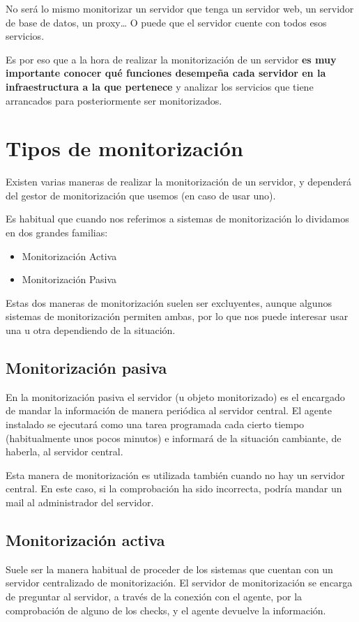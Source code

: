 No será lo mismo monitorizar un servidor que tenga un servidor web, un servidor de base de datos, un proxy… O puede que el servidor cuente con todos esos servicios.

Es por eso que a la hora de realizar la monitorización de un servidor \textbf{es muy importante conocer qué funciones desempeña cada servidor en la infraestructura a la que pertenece} y analizar los servicios que tiene arrancados para posteriormente ser monitorizados.

\fi

\section{Tipos de monitorización}
Existen varias maneras de realizar la monitorización de un servidor, y dependerá del gestor de monitorización que usemos (en caso de usar uno).

Es habitual que cuando nos referimos a sistemas de monitorización lo dividamos en dos grandes familias:
\begin{itemize}
    \item Monitorización Activa
    \item Monitorización Pasiva
\end{itemize}

Estas dos maneras de monitorización suelen ser excluyentes, aunque algunos sistemas de monitorización permiten ambas, por lo que nos puede interesar usar una u otra dependiendo de la situación.


\subsection{Monitorización pasiva}
En la monitorización pasiva el servidor (u objeto monitorizado) es el encargado de mandar la información de manera periódica al servidor central. El agente instalado se ejecutará como una tarea programada cada cierto tiempo (habitualmente unos pocos minutos) e informará de la situación cambiante, de haberla, al servidor central.

Esta manera de monitorización es utilizada también cuando no hay un servidor central. En este caso, si la comprobación ha sido incorrecta, podría mandar un mail al administrador del servidor.

\subsection{Monitorización activa}
Suele ser la manera habitual de proceder de los sistemas que cuentan con un servidor centralizado de monitorización. El servidor de monitorización se encarga de preguntar al servidor, a través de la conexión con el agente, por la comprobación de alguno de los checks, y el agente devuelve la información.

